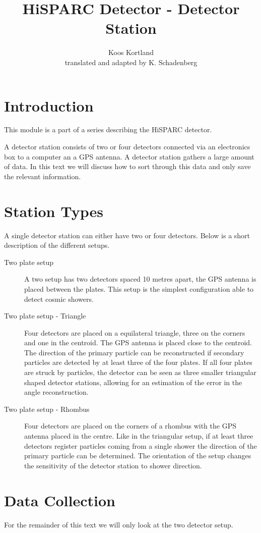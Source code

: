 \documentclass[12pt,a4paper]{article}
\author{Koos Kortland \\ translated and adapted by K. Schadenberg}
\date{}
\title{HiSPARC Detector - Detector Station}
\numberwithin{equation}{section}
\numberwithin{figure}{section}
\numberwithin{table}{section}
\begin{document}
\maketitle

\section{Introduction}
This module is a part of a series describing the HiSPARC detector.

A detector station consists of two or four detectors connected via an electronics box to a computer an a GPS antenna. A detector station gathers a large amount of data. In this text we will discuss how to sort through this data and only save the relevant information.

\section{Station Types}
A single detector station can either have two or four detectors. Below is a short description of the different setups.
\begin{description}
\item [Two plate setup] A two setup has two detectors spaced 10 metres apart, the GPS antenna is placed between the plates. This setup is the simplest configuration able to detect cosmic showers.
\item [Two plate setup - Triangle] Four detectors are placed on a equilateral triangle, three on the corners and one in the centroid. The GPS antenna is placed close to the centroid. The direction of the primary particle can be reconstructed if secondary particles are detected by at least three of the four plates.  If all four plates are struck by particles, the detector can be seen as three smaller triangular shaped detector stations, allowing for an estimation of the error in the angle reconstruction.
\item [Two plate setup - Rhombus] Four detectors are placed on the corners of a rhombus with the GPS antenna placed in the centre. Like in the triangular setup, if at least three detectors register particles coming from a single shower the direction of the primary particle can be determined. The orientation of the setup changes the sensitivity of the detector station to shower direction.
\end{description}

\section{Data Collection}
For the remainder of this text we will only look at the two detector setup.
\end{document}
